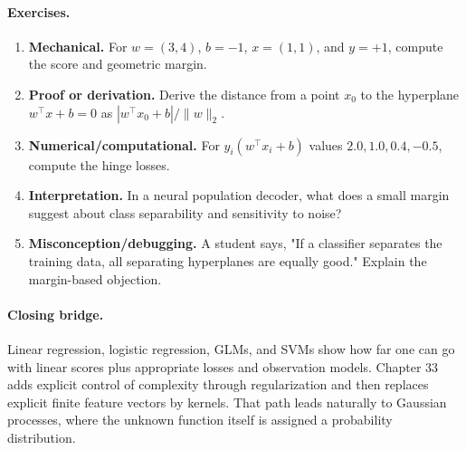 \paragraph{Exercises.}
\begin{enumerate}[label=\textbf{32.4.\arabic*.}, leftmargin=*]
\item \textbf{Mechanical.} For \(w=(3,4)\), \(b=-1\), \(x=(1,1)\), and \(y=+1\), compute the score and geometric margin.
\item \textbf{Proof or derivation.} Derive the distance from a point \(x_0\) to the hyperplane \(w^\top x+b=0\) as \(|w^\top x_0+b|/\|w\|_2\).
\item \textbf{Numerical/computational.} For \(y_i(w^\top x_i+b)\) values \(2.0,1.0,0.4,-0.5\), compute the hinge losses.
\item \textbf{Interpretation.} In a neural population decoder, what does a small margin suggest about class separability and sensitivity to noise?
\item \textbf{Misconception/debugging.} A student says, "If a classifier separates the training data, all separating hyperplanes are equally good." Explain the margin-based objection.
\end{enumerate}

\paragraph{Closing bridge.}
Linear regression, logistic regression, GLMs, and SVMs show how far one can go with linear scores plus appropriate losses and observation models. Chapter 33 adds explicit control of complexity through regularization and then replaces explicit finite feature vectors by kernels. That path leads naturally to Gaussian processes, where the unknown function itself is assigned a probability distribution.

\clearpage
